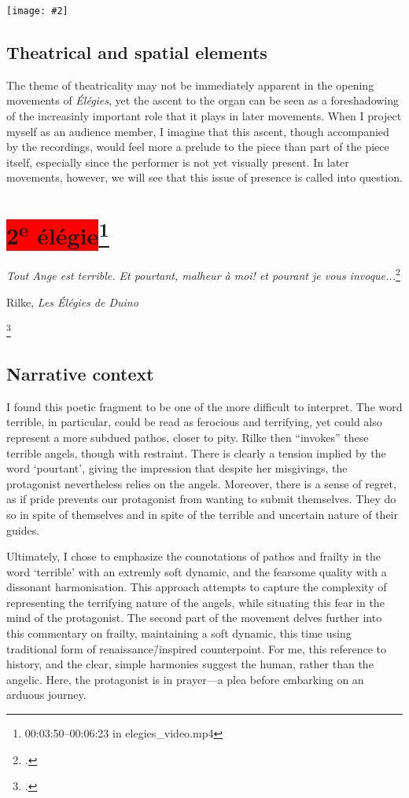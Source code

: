 \documentclass[12pt,twoside,maitrise]{dms_ks}
\newcommand{\customincludeexamples}[4][]{%
    \begin{example}[H]
        \centering
        \texttt{[image: \#2]}
        \caption{#4}
	\label{#3} 
    \end{example}
}
\theoremstyle{definition}
\begin{document}
{\customincludeexamples[width=\textwidth]{1e_3}{ex:1e_3}{Rising chords based on open fifths and fourths (p.~1, sys.~3).}

\subsection{Theatrical and spatial elements}

The theme of theatricality may not be immediately apparent in the opening movements of \textit{Élégies}, yet the ascent to the organ can be seen as a foreshadowing of the increasinly important role that it plays in later movements.
When I project myself as an audience member, I imagine that this ascent, though accompanied by the recordings, would feel more a prelude to the piece than part of the piece itself, especially since the performer is not yet visually present.
In later movements, however, we will see that this issue of presence is called into question.

\section{\colorbox{red}{2\textsuperscript{e} élégie}\footnote{00:03:50--00:06:23 in elegies\_video.mp4}}

\epigraph{\textit{Tout Ange est terrible. Et pourtant, malheur à moi! et pourant je vous invoque...}\footcite[9]{rilke_egies_1986}}{Rilke, \textit{Les Élégies de Duino}\protect\footnotemark}

\footcitetext[19]{rilke_egies_1986}

\subsection{Narrative context}

I found this poetic fragment to be one of the more difficult to interpret. 
The word terrible, in particular, could be read as ferocious and terrifying, yet could also represent a more subdued pathos, closer to pity.
Rilke then “invokes” these terrible angels, though with restraint.
There is clearly a tension implied by the word `pourtant', giving the impression that despite her misgivings, the protagonist nevertheless relies on the angels.
Moreover, there is a sense of regret, as if pride prevents our protagonist from wanting to submit themselves.
They do so in spite of themselves and in spite of the terrible and uncertain nature of their guides.

Ultimately, I chose to emphasize the connotations of pathos and frailty in the word `terrible' with an extremly soft dynamic, and the fearsome quality with a dissonant harmonisation.
This approach attempts to capture the complexity of representing the terrifying nature of the angels, while situating this fear in the mind of the protagonist.
The second part of the movement delves further into this commentary on frailty, maintaining a soft dynamic, this time using traditional form of renaissance\=/inspired counterpoint.
For me, this reference to history, and the clear, simple harmonies suggest the human, rather than the angelic.
Here, the protagonist is in prayer---a plea before embarking on an arduous journey.

}
\end{document}
